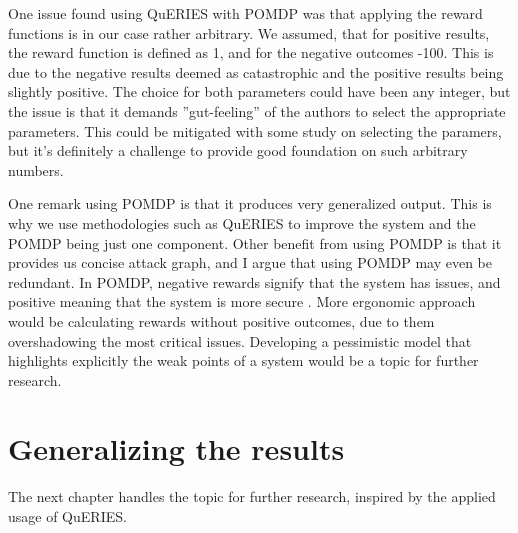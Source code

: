 One issue found using QuERIES with POMDP was that applying the
reward functions is in our case rather arbitrary. We assumed, that for
positive results, the reward function is defined as 1, and for the
negative outcomes -100. This is due to the negative results deemed as
catastrophic and the positive results being slightly positive. The
choice for both parameters could have been any integer, but the issue
is that it demands ''gut-feeling'' of the authors to select the
appropriate parameters. This could be mitigated with some study on
selecting the paramers, but it's definitely a challenge to provide
good foundation on such arbitrary numbers.

One remark using POMDP is that it produces very generalized
output. This is why we use methodologies such as QuERIES to improve
the system and the POMDP being just one component. Other benefit from
using POMDP is that it provides us concise attack graph, and I argue
that using POMDP may even be redundant. In POMDP, negative rewards
signify that the system has issues, and positive meaning that the
system is more secure \cite{mcabeeMarkov}. More ergonomic approach would
be calculating rewards without positive outcomes, due to them
overshadowing the most critical issues. Developing a pessimistic
model that highlights explicitly the weak points of a system would be
a topic for further research. 

\section{Generalizing the results}



The next chapter handles the topic for further research, inspired by
the applied usage of QuERIES.
